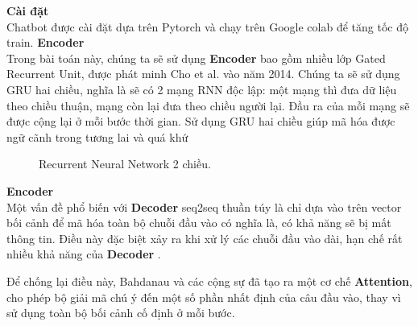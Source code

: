 \large\textbf{Cài đặt} \\[0.2em]
Chatbot được cài đặt dựa trên Pytorch và chạy trên Google colab để tăng tốc độ train.
\large\textbf{Encoder} \\[0.2em]
 Trong bài toán này, chúng ta sẽ sử dụng \textbf{Encoder} bao gồm nhiều lớp Gated Recurrent Unit, được phát minh Cho et
al. vào năm 2014. Chúng ta sẽ sử dụng GRU hai chiều, nghĩa là sẽ có 2 mạng RNN độc lập: một mạng thì đưa dữ liệu theo
chiều thuận, mạng còn lại đưa theo chiều người lại. Đầu ra của mỗi mạng sẽ được cộng lại ở mỗi bước thời gian. Sử
dụng GRU hai chiều giúp mã hóa được ngữ cãnh trong tương lai và quá khứ
\begin{figure}[!htb]
    \caption{\label{fig:rnn-rolled} Recurrent Neural Network 2 chiều.}
\end{figure}

\large\textbf{Encoder} \\[0.2em]
Một vấn đề phổ biến với \textbf{Decoder} seq2seq thuần túy là chỉ dựa vào trên vector bối cảnh để mã hóa
toàn bộ chuỗi đầu vào có nghĩa là, có khả năng sẽ bị mất thông tin. Điều này đặc biệt xảy ra khi xử lý các chuỗi đầu
vào dài, hạn chế rất nhiều khả năng của \textbf{Decoder} .

Để chống lại điều này, Bahdanau và các cộng sự  đã tạo ra một cơ chế \textbf{Attention}, cho phép bộ giải mã chú ý đến
một số phần nhất định của câu đầu vào, thay vì sử dụng toàn bộ bối cảnh cố định ở mỗi bước.

